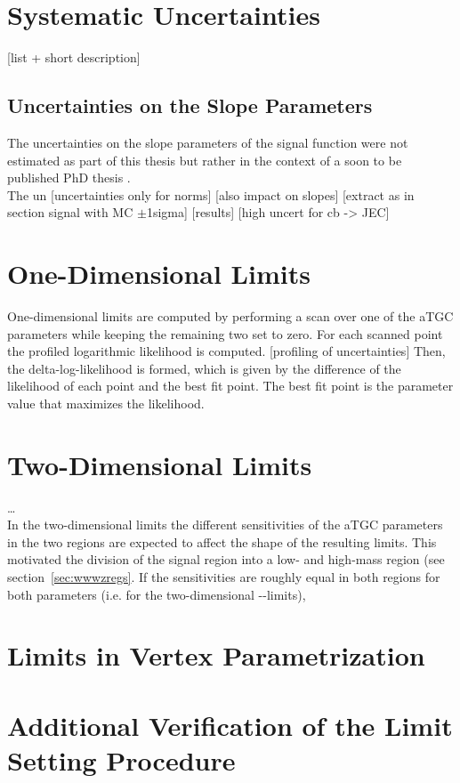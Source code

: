 \section{Systematic Uncertainties}
\label{sec:systematics}
[list + short description]
\subsection{Uncertainties on the Slope Parameters}
\label{sec:uncslopesig}
The uncertainties on the slope parameters of the signal function were not estimated as part of this thesis but rather in the context of a soon to be published PhD thesis \cite{IVAN}.\\

\noindent The un
[uncertainties only for norms]
[also impact on slopes]
[extract as in section signal with MC $\pm$1sigma]
[results]
[high uncert for cb -> JEC]


\section{One-Dimensional Limits}
One-dimensional limits are computed by performing a scan over one of the aTGC parameters while keeping the remaining two set to zero. For each scanned point the profiled logarithmic likelihood is computed.
[profiling of uncertainties]
Then, the delta-log-likelihood is formed, which is given by the difference of the likelihood of each point and the best fit point. The best fit point is the parameter value that maximizes the likelihood. 


\section{Two-Dimensional Limits}
\label{sec:2dlims}
\dots \\
\noindent In the two-dimensional limits the different sensitivities of the aTGC parameters in the two regions are expected to affect the shape of the resulting limits. This motivated the division of the signal region into a low- and high-mass region (see section~\ref{sec:wwwzregs}. If the sensitivities are roughly equal in both regions for both parameters (i.e. for the two-dimensional \Tcwww -\Tccw -limits), 


\section{Limits in Vertex Parametrization}
\label{sec:vertex}


\section{Additional Verification of the Limit Setting Procedure}
